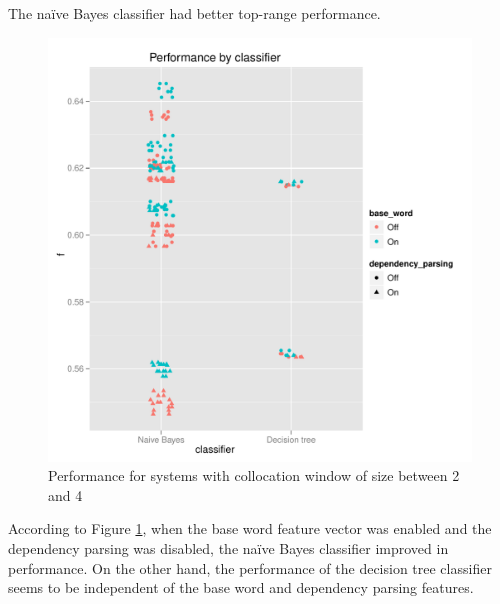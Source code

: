\documentclass{article}
\newcommand{\naive}{na\"ive}
\begin{document}
The \naive{} Bayes classifier had better top-range performance.

\begin{figure}
\includegraphics[width=\textwidth]{pg_0003}
\caption{\label{fig3}Performance for systems with collocation window of size between 2 and 4}
\end{figure}

According to Figure \ref{fig3}, when the base word feature vector was
enabled and the dependency parsing was disabled, the \naive{} Bayes
classifier improved in performance. On the other hand, the performance
of the decision tree classifier seems to be independent of the base
word and dependency parsing features.
\end{document}
